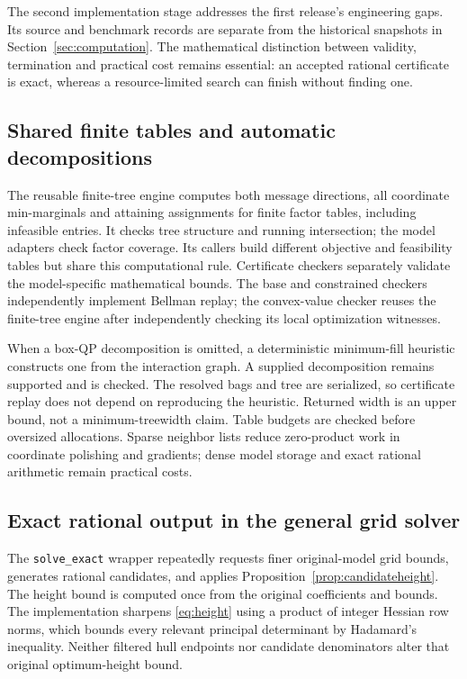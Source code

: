 The second implementation stage addresses the first release's engineering
gaps. Its source and benchmark records are separate from the historical
snapshots in Section~\ref{sec:computation}. The mathematical distinction
between validity, termination and practical cost remains essential:
an accepted rational certificate is exact, whereas a resource-limited
search can finish without finding one.

\subsection{Shared finite tables and automatic decompositions}
The reusable finite-tree engine computes both message directions, all
coordinate min-marginals and attaining assignments for finite factor tables,
including infeasible entries. It checks tree structure and running
intersection; the model adapters check factor coverage. Its callers build
different objective and feasibility
tables but share this computational rule. Certificate checkers separately
validate the model-specific mathematical bounds. The base and constrained
checkers independently implement Bellman replay; the convex-value checker
reuses the finite-tree engine after independently checking its local
optimization witnesses.

When a box-QP decomposition is omitted, a deterministic minimum-fill
heuristic constructs one from the interaction graph. A supplied
decomposition remains supported and is checked. The resolved bags and tree
are serialized, so certificate replay does not depend on reproducing the
heuristic. Returned width is an upper bound, not a minimum-treewidth claim.
Table budgets are checked before oversized allocations. Sparse neighbor
lists reduce zero-product work in coordinate polishing and gradients;
dense model storage and exact rational arithmetic remain practical costs.

\subsection{Exact rational output in the general grid solver}
The \texttt{solve\_exact} wrapper repeatedly requests finer original-model
grid bounds, generates rational candidates, and applies
Proposition~\ref{prop:candidateheight}. The height bound is computed once
from the original coefficients and bounds. The implementation sharpens
\eqref{eq:height} using a product of integer Hessian row norms, which bounds
every relevant principal determinant by Hadamard's inequality. Neither
filtered hull endpoints nor candidate denominators alter that original
optimum-height bound.

